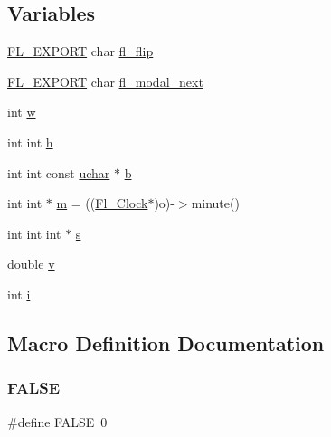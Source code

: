 \subsection*{Variables}
\begin{DoxyCompactItemize}
\item 
\hyperlink{_fl___export_8_h_aa9ba29a18aee9d738370a06eeb4470fc}{F\+L\+\_\+\+E\+X\+P\+O\+RT} char \hyperlink{forms_8_h_a009d493752306f784ef169df712f0461}{fl\+\_\+flip}
\item 
\hyperlink{_fl___export_8_h_aa9ba29a18aee9d738370a06eeb4470fc}{F\+L\+\_\+\+E\+X\+P\+O\+RT} char \hyperlink{forms_8_h_a0ef577a96426e2b96298d1f2bb1cd1f5}{fl\+\_\+modal\+\_\+next}
\item 
int \hyperlink{forms_8_h_aac374e320caaadeca4874add33b62af2}{w}
\item 
int int \hyperlink{forms_8_h_a7e427ba5b307f9068129699250690066}{h}
\item 
int int const \hyperlink{fl__types_8h_a65f85814a8290f9797005d3b28e7e5fc}{uchar} $\ast$ \hyperlink{forms_8_h_a0ba06a290a384fa06b1b90745827dae2}{b}
\item 
int int $\ast$ \hyperlink{forms_8_h_a2ccd5640c2b2869841c5dab22b937079}{m} = ((\hyperlink{class_fl___clock}{Fl\+\_\+\+Clock}$\ast$)o)-\/$>$minute()
\item 
int int int $\ast$ \hyperlink{forms_8_h_a672b4f0a8c8a6db61068c721f799d87f}{s}
\item 
double \hyperlink{forms_8_h_a3b90d5a73541ab9402511d87bed076ef}{v}
\item 
int \hyperlink{forms_8_h_acb559820d9ca11295b4500f179ef6392}{i}
\end{DoxyCompactItemize}


\subsection{Macro Definition Documentation}
\mbox{\label{forms_8_h_aa93f0eb578d23995850d61f7d61c55c1}} 
\subsubsection{\texorpdfstring{F\+A\+L\+SE}{FALSE}}
{\footnotesize\ttfamily \#define F\+A\+L\+SE~0}

\mbox{\label{forms_8_h_a6d75ce92e827afd002a77bb2ba6bb413}} 
